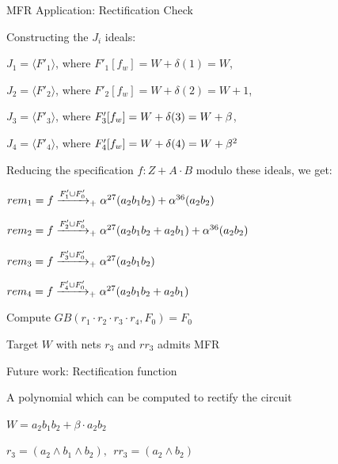 \begin{frame}{\large MFR Application: Rectification Check}
\bi
	\item Constructing the $J_i$ ideals:
	\bi
		\item {\small$J_1 = \langle F'_1\rangle$, where $F'_1[f_w]=W+\delta(1)=W$},
		\item {\small$J_2 = \langle F'_2\rangle$, where $F'_2[f_w]=W+\delta(2)=W+1$},
		\item {\small$J_3 = \langle F'_3\rangle$, where $F'_3[f_w]=W+\delta(3)=W+\beta$},
		\item {\small$J_4 = \langle F'_4\rangle$, where $F'_4[f_w]=W+\delta(4)=W+\beta^2$}
	\ei
	\vspace{0.1in}
	\item Reducing the specification $f: Z+A\cdot B$ modulo these ideals, we get:
\bi
\item $rem_1 = f \xrightarrow[]{F'_1\cup F'_{0}}_+{\alpha^{27} (a_2b_1b_2)+\alpha^{36} (a_2b_2)}$
\item $rem_2 = f \xrightarrow[]{F'_2\cup F'_{0}}_+{\alpha^{27} (a_2b_1b_2+a_2b_1)+\alpha^{36} (a_2b_2)}$
\item $rem_3 = f \xrightarrow[]{F'_3\cup F'_{0}}_+{\alpha^{27} (a_2b_1b_2)}$
\item $rem_4 = f \xrightarrow[]{F'_4\cup F'_{0}}_+{\alpha^{27} (a_2b_1b_2+a_2b_1)}$
\ei
	\item Compute $GB(r_1\cdot r_2 \cdot r_3 \cdot r_4, F_0)=F_0$
	\item Target $W$ with nets $r_3$ and $rr_3$ admits MFR
\ei
\end{frame}

\begin{frame}{\large Future work: Rectification function}

\bi
\item A polynomial which can be computed to rectify the circuit
	\bi
		\item $W = a_2b_1b_2 + \beta \cdot a_2b_2$
		\item $r_3 = (a_2 \wedge b_1 \wedge b_2),~~rr_3 = (a_2 \wedge b_2)$
	\ei
\ei

\end{frame}


